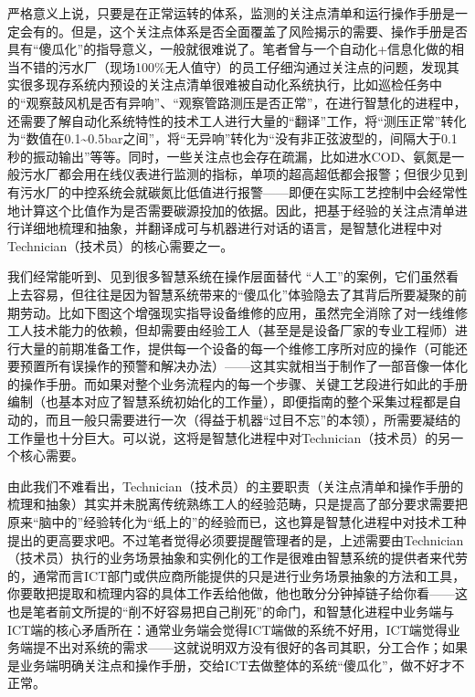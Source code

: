 \documentclass[]{book}
\begin{document}
严格意义上说，只要是在正常运转的体系，监测的关注点清单和运行操作手册是一定会有的。但是，这个关注点体系是否全面覆盖了风险揭示的需要、操作手册是否具有``傻瓜化''的指导意义，一般就很难说了。笔者曾与一个自动化+信息化做的相当不错的污水厂（现场100\%无人值守）的员工仔细沟通过关注点的问题，发现其实很多现存系统内预设的关注点清单很难被自动化系统执行，比如巡检任务中的``观察鼓风机是否有异响''、``观察管路测压是否正常''，在进行智慧化的进程中，还需要了解自动化系统特性的技术工人进行大量的``翻译''工作，将``测压正常''转化为``数值在0.1\textasciitilde{}0.5bar之间''，将``无异响''转化为``没有非正弦波型的，间隔大于0.1秒的振动输出''等等。同时，一些关注点也会存在疏漏，比如进水COD、氨氮是一般污水厂都会用在线仪表进行监测的指标，单项的超高超低都会报警；但很少见到有污水厂的中控系统会就碳氮比低值进行报警------即便在实际工艺控制中会经常性地计算这个比值作为是否需要碳源投加的依据。因此，把基于经验的关注点清单进行详细地梳理和抽象，并翻译成可与机器进行对话的语言，是智慧化进程中对Technician（技术员）的核心需要之一。

我们经常能听到、见到很多智慧系统在操作层面替代 ``人工''的案例，它们虽然看上去容易，但往往是因为智慧系统带来的``傻瓜化''体验隐去了其背后所要凝聚的前期劳动。比如下图这个增强现实指导设备维修的应用，虽然完全消除了对一线维修工人技术能力的依赖，但却需要由经验工人（甚至是是设备厂家的专业工程师）进行大量的前期准备工作，提供每一个设备的每一个维修工序所对应的操作（可能还要预置所有误操作的预警和解决办法）------这其实就相当于制作了一部音像一体化的操作手册。而如果对整个业务流程内的每一个步骤、关键工艺段进行如此的手册编制（也基本对应了智慧系统初始化的工作量），即便指南的整个采集过程都是自动的，而且一般只需要进行一次（得益于机器``过目不忘''的本领），所需要凝结的工作量也十分巨大。可以说，这将是智慧化进程中对Technician（技术员）的另一个核心需要。

由此我们不难看出，Technician（技术员）的主要职责（关注点清单和操作手册的梳理和抽象）其实并未脱离传统熟练工人的经验范畴，只是提高了部分要求需要把原来``脑中的''经验转化为``纸上的''的经验而已，这也算是智慧化进程中对技术工种提出的更高要求吧。不过笔者觉得必须要提醒管理者的是，上述需要由Technician（技术员）执行的业务场景抽象和实例化的工作是很难由智慧系统的提供者来代劳的，通常而言ICT部门或供应商所能提供的只是进行业务场景抽象的方法和工具，你要敢把提取和梳理内容的具体工作丢给他做，他也敢分分钟掉链子给你看------这也是笔者前文所提的``削不好容易把自己削死''的命门，和智慧化进程中业务端与ICT端的核心矛盾所在：通常业务端会觉得ICT端做的系统不好用，ICT端觉得业务端提不出对系统的需求------这就说明双方没有很好的各司其职，分工合作；如果是业务端明确关注点和操作手册，交给ICT去做整体的系统``傻瓜化''，做不好才不正常。
\end{document}
